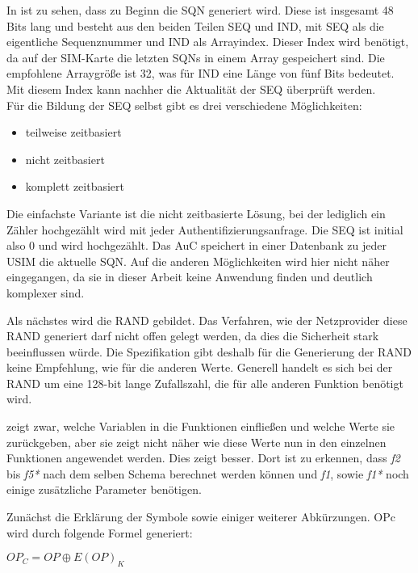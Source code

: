  In  ist zu sehen, dass zu Beginn die \ac{SQN} generiert wird.
 Diese ist insgesamt 48 Bits lang und besteht aus den beiden Teilen SEQ und IND, mit SEQ als
 die eigentliche Sequenznummer und IND als Arrayindex. Dieser Index wird benötigt, da auf
 der SIM-Karte die letzten SQNs in einem Array gespeichert sind. Die empfohlene Arraygröße ist
 32, was für IND eine Länge von fünf Bits bedeutet. Mit diesem Index kann nachher die
 Aktualität der SEQ überprüft werden.\cite{3gpp.33.102} \\
 Für die Bildung der SEQ selbst gibt es drei verschiedene Möglichkeiten:
 \begin{itemize}
  \item teilweise zeitbasiert
  \item nicht zeitbasiert
  \item komplett zeitbasiert
 \end{itemize}
 
 Die einfachste Variante ist die nicht zeitbasierte Lösung, bei der lediglich ein Zähler hochgezählt
 wird mit jeder Authentifizierungsanfrage. Die SEQ ist initial also 0 und wird hochgezählt. Das
 \ac{AuC} speichert in einer Datenbank \cite{3gpp.33.102} zu jeder USIM die aktuelle SQN.
 Auf die anderen  Möglichkeiten wird hier nicht näher eingegangen, da sie in dieser Arbeit
 keine Anwendung finden und deutlich komplexer sind.
 
 Als nächstes wird die \ac{RAND} gebildet. Das Verfahren, wie der Netzprovider diese RAND
 generiert darf nicht offen gelegt werden, da dies die Sicherheit stark beeinflussen würde. Die
 Spezifikation gibt deshalb für die Generierung der RAND keine Empfehlung, wie für die anderen
 Werte. Generell handelt es sich bei der RAND um eine 128-bit lange Zufallszahl, die für alle
 anderen Funktion benötigt wird.
 
  zeigt zwar, welche Variablen in die Funktionen einfließen und
 welche Werte sie zurückgeben, aber sie zeigt nicht näher wie diese Werte nun in den einzelnen
 Funktionen angewendet werden. Dies zeigt  besser. Dort ist
 zu erkennen, dass \emph{f2} bis \emph{f5*} nach dem selben Schema berechnet werden können und
 \emph{f1}, sowie \emph{f1*} noch einige zusätzliche Parameter benötigen.
 
 Zunächst die Erklärung der Symbole sowie einiger weiterer Abkürzungen. OPc wird durch
 folgende Formel generiert:
 \begin{center}
  $OP_{C} = OP \oplus E(OP)_{K}$
 \end{center}
 

